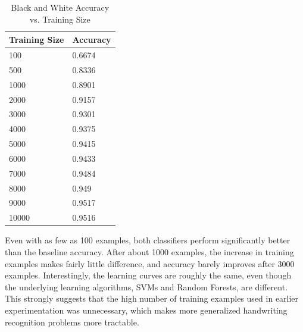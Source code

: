 \documentclass[12pt]{article}
\begin{document}
\begin{table}[H]
\centering
\caption{Black and White Accuracy vs. Training Size}
    \begin{tabular}{|l|l|}
    \hline
    Training Size & Accuracy \\ \hline
    100      & 0.6674   \\ \hline
    500      & 0.8336   \\ \hline
    1000      & 0.8901   \\ \hline
    2000      & 0.9157   \\ \hline
    3000      & 0.9301   \\ \hline
    4000      & 0.9375   \\ \hline
    5000      & 0.9415   \\ \hline
    6000      & 0.9433   \\ \hline
    7000      & 0.9484   \\ \hline
    8000      & 0.949   \\ \hline
    9000      & 0.9517   \\ \hline
    10000      & 0.9516   \\ \hline
    \end{tabular}
\end{table}

Even with as few as 100 examples, both classifiers perform significantly better than the baseline accuracy. After about 1000 examples, the increase in training examples makes fairly little difference, and accuracy barely improves after 3000 examples. Interestingly, the learning curves are roughly the same, even though the underlying learning algorithms, SVMs and Random Forests, are different. This strongly suggests that the high number of training examples used in earlier experimentation was unnecessary, which makes more generalized handwriting recognition problems more tractable. 
\end{document}
